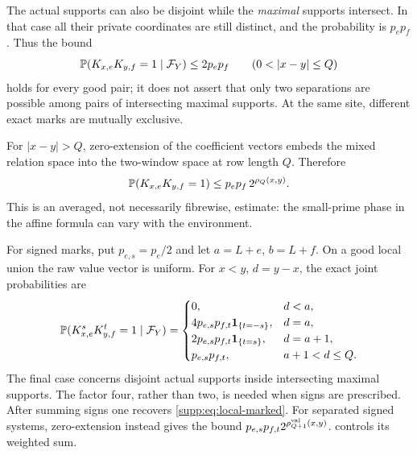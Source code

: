 The actual supports can also be disjoint while the \emph{maximal} supports
intersect. In that case all their private coordinates are still distinct,
and the probability is $p_ep_f$. Thus the bound
\begin{equation}\label{supp:eq:local-marked}
 \PP(K_{x,e}K_{y,f}=1\mid\mathcal F_Y)\le 2p_ep_f
 \qquad(0<|x-y|\le Q)
\end{equation}
holds for every good pair; it does not assert that only two separations are
possible among pairs of intersecting maximal supports. At the same site,
different exact marks are mutually exclusive.

For $|x-y|>Q$, zero-extension of the coefficient vectors embeds the mixed
relation space into the two-window space at row length $Q$. Therefore
\begin{equation}\label{supp:eq:mixed-domination}
 \mathbb P(K_{x,e}K_{y,f}=1)\le p_ep_f\,2^{\rho_Q(x,y)}.
\end{equation}
This is an averaged, not necessarily fibrewise, estimate: the small-prime
phase in the affine formula can vary with the environment.


For signed marks, put $p_{e,s}=p_e/2$ and let $a=L+e$, $b=L+f$.
On a good local union the raw value vector is uniform. For $x<y$,
$d=y-x$, the exact joint probabilities are
\[
 \mathbb P(K^s_{x,e}K^t_{y,f}=1\mid\mathcal F_Y)=
 \begin{cases}
  0,&d<a,\\
  4p_{e,s}p_{f,t}\mathbf 1_{\{t=-s\}},&d=a,\\
  2p_{e,s}p_{f,t}\mathbf 1_{\{t=s\}},&d=a+1,\\
  p_{e,s}p_{f,t},&a+1<d\le Q.
 \end{cases}
\]
The final case concerns disjoint actual supports inside intersecting
maximal supports. The factor four, rather than two, is needed when signs
are prescribed. After summing signs one recovers
\eqref{supp:eq:local-marked}. For separated signed systems, zero-extension
instead gives the bound
$p_{e,s}p_{f,t}2^{\rho^{\rm val}_{Q+1}(x,y)}$.
 controls its weighted sum.

